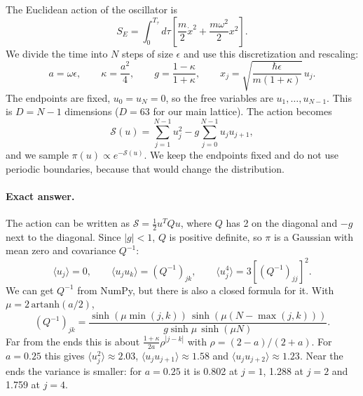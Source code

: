 \documentclass[11pt]{article}
\begin{document}
The Euclidean action of the oscillator is
\begin{equation}
  S_E = \int_0^{T_\tau} d\tau \left[ \frac{m}{2}\dot x^2 + \frac{m\omega^2}{2}x^2 \right].
\end{equation}
We divide the time into $N$ steps of size $\epsilon$ and use this discretization and rescaling:
\begin{equation}
  a = \omega\epsilon, \qquad \kappa = \frac{a^2}{4}, \qquad g = \frac{1-\kappa}{1+\kappa}, \qquad x_j = \sqrt{\frac{\hbar\epsilon}{m(1+\kappa)}}\, u_j .
\end{equation}
The endpoints are fixed, $u_0 = u_N = 0$, so the free variables are $u_1, \dots, u_{N-1}$. This is $D = N-1$ dimensions ($D = 63$ for our main lattice). The action becomes
\begin{equation}
  \mathcal S(u) = \sum_{j=1}^{N-1} u_j^2 - g \sum_{j=0}^{N-1} u_j u_{j+1},
  \label{eq:action}
\end{equation}
and we sample $\pi(u) \propto e^{-\mathcal S(u)}$. We keep the endpoints fixed and do not use periodic boundaries, because that would change the distribution.

\paragraph{Exact answer.} The action can be written as $\mathcal S = \frac12 u^T Q u$, where $Q$ has 2 on the diagonal and $-g$ next to the diagonal. Since $|g| < 1$, $Q$ is positive definite, so $\pi$ is a Gaussian with mean zero and covariance $Q^{-1}$:
\begin{equation}
  \langle u_j \rangle = 0, \qquad \langle u_j u_k \rangle = (Q^{-1})_{jk}, \qquad \langle u_j^4 \rangle = 3 \left[(Q^{-1})_{jj}\right]^2 .
  \label{eq:exact}
\end{equation}
We can get $Q^{-1}$ from NumPy, but there is also a closed formula for it. With $\mu = 2\,\mathrm{artanh}(a/2)$,
\begin{equation}
  (Q^{-1})_{jk} = \frac{\sinh(\mu \min(j,k))\, \sinh(\mu(N-\max(j,k)))}{g \sinh\mu \, \sinh(\mu N)} .
  \label{eq:Qinv}
\end{equation}
Far from the ends this is about $\frac{1+\kappa}{2a}\rho^{|j-k|}$ with $\rho = (2-a)/(2+a)$. For $a = 0.25$ this gives $\langle u_j^2\rangle \approx 2.03$, $\langle u_j u_{j+1}\rangle \approx 1.58$ and $\langle u_j u_{j+2}\rangle \approx 1.23$. Near the ends the variance is smaller: for $a = 0.25$ it is 0.802 at $j = 1$, 1.288 at $j = 2$ and 1.759 at $j = 4$.
\end{document}

